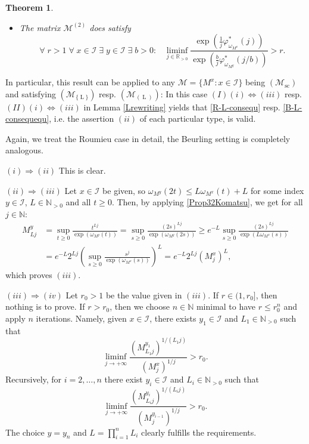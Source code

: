 \documentclass[10pt]{amsart}%
\numberwithin{equation}{section}
\theoremstyle{plain}
\newtheorem{theorem}[proposition]{Theorem}
\newcommand{\RR}{\mathbb{R}}
\newcommand{\NN}{\mathbb{N}}
\let\on=\operatorname
\begin{document}
\begin{theorem}
\begin{itemize}
\begin{itemize}
\item[$(viii)$] The matrix $\mathcal{M}^{(2)}$ does satisfy
\begin{equation*}%
   \forall\;r>1\;\forall\;x\in\mathcal{I}\;\exists\;y\in\mathcal{I}\;\exists\;b>0:\;\;\; \liminf_{j\in\RR_{>0}}\frac{\exp(\frac{1}{j}\varphi^{*}_{\omega_{M^x}}(j))}{\exp(\frac{b}{j}\varphi^{*}_{\omega_{M^y}}(j/b))}>r.
\end{equation*}
\end{itemize}
\end{itemize}
\end{theorem}

In particular, this result can be applied to any $\mathcal{M}=\{M^x: x\in\mathcal{I}\}$ being \hyperlink{Msc}{$(\mathcal{M}_{\on{sc}})$} and satisfying \hyperlink{R-L}{$(\mathcal{M}_{\{\on{L}\}})$} resp. \hyperlink{B-L}{$(\mathcal{M}_{(\on{L})})$}: In this case $(I)(i)\Leftrightarrow(iii)$ resp. $(II)(i)\Leftrightarrow(iii)$ in Lemma \ref{Lrewriting} yields that \eqref{R-L-consequ} resp. \eqref{B-L-consequequ}, i.e. the assertion $(ii)$ of each particular type, is valid.\vspace{6pt}

Again, we treat the Roumieu case in detail, the Beurling setting is completely analogous.\vspace{6pt}

$(i)\Rightarrow(ii)$ This is clear.\vspace{6pt}

$(ii)\Rightarrow(iii)$ Let $x\in\mathcal{I}$ be given, so $\omega_{M^y}(2t)\le L\omega_{M^x}(t)+L$ for some index $y\in\mathcal{I}$, $L\in\NN_{>0}$ and all $t\ge 0$. Then, by applying \eqref{Prop32Komatsu}, we get for all $j\in\NN$:
\begin{align*}
M^y_{Lj}&=\sup_{t\ge 0}\frac{t^{Lj}}{\exp(\omega_{M^y}(t))}=\sup_{s\ge 0}\frac{(2s)^{Lj}}{\exp(\omega_{M^y}(2s))}\ge e^{-L}\sup_{s\ge 0}\frac{(2s)^{Lj}}{\exp(L\omega_{M^x}(s))}
\\&
=e^{-L}2^{Lj}\left(\sup_{s\ge 0}\frac{s^j}{\exp(\omega_{M^x}(s))}\right)^{L}=e^{-L}2^{Lj}(M^x_j)^{L},
\end{align*}
which proves $(iii)$.\vspace{6pt}

$(iii)\Rightarrow(iv)$ Let $r_0>1$ be the value given in $(iii)$. If $r\in(1,r_0]$, then nothing is to prove. If $r>r_0$, then we choose $n\in\NN$ minimal to have $r\le r_0^n$ and apply $n$ iterations. Namely, given $x\in\mathcal{I}$, there exists $y_1\in\mathcal{I}$ and $L_1\in\NN_{>0}$ such that
$$
\liminf_{j\rightarrow+\infty}\frac{(M^{y_1}_{L_1j})^{1/(L_1j)}}{(M^x_j)^{1/j}}>r_0.
$$
Recursively, for $i=2,\dots,n$ there exist $y_i\in\mathcal{I}$ and $L_i\in\NN_{>0}$ such that
$$
\liminf_{j\rightarrow+\infty}\frac{(M^{y_i}_{L_ij})^{1/(L_ij)}}{(M^{y_{i-1}}_j)^{1/j}}>r_0.
$$
The choice $y=y_n$ and $L=\prod_{i=1}^n L_i$ clearly fulfills the requirements.
\vspace{6pt}
\end{document}
